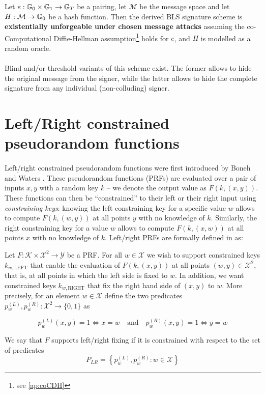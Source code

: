 \begin{theorem}
	Let $e : \mathbb{G}_0 \times \mathbb{G}_1 \rightarrow \mathbb{G}_T$ be a pairing, let $\mathcal{M}$ be the message space and let $H: \mathcal{M} \rightarrow \mathbb{G}_0$ be a hash function. Then the derived BLS signature scheme is \textbf{existentially unforgeable under chosen message attacks} assuming the co-Computational Diffie-Hellman assumption\footnote{see \autoref{ap:coCDH}} holds for $e$, and $H$ is modelled as a random oracle.
\end{theorem} 

\paragraph{} Blind and/or threshold variants of this scheme exist. The former allows to hide the original message from the signer, while the latter allows to hide the complete signature from any individual (non-colluding) signer.




\section{Left/Right constrained pseudorandom functions}

\paragraph{} Left/right constrained pseudorandom functions were first introduced by Boneh and Waters \cite{LRPRF}. These pseudorandom functions (PRFs) are evaluated over a pair of inputs $x,y$ with a random key $k$ -- we denote the output value as $F(k, (x,y))$. These functions can then be ``constrained'' to their left or their right input using \textit{constraining keys}: knowing the left constraining key for a specific value $w$ allows to compute $F(k, (w,y))$ at all points $y$ with no knowledge of $k$. Similarly, the right constraining key for a value $w$ allows to compute $F(k, (x,w))$ at all points $x$ with no knowledge of $k$. Left/right PRFs are formally defined in \cite{LRPRF} as:

\begin{definition}
	Let $F: \mathcal{K} \times \mathcal{X}^2 \rightarrow \mathcal{Y}$ be a PRF. For all $w \in \mathcal{X}$ we wish to support constrained keys $k_{w, \mathrm{LEFT}}$ that enable the evaluation of $F(k, (x,y))$ at all points $(w,y)\in \mathcal{X}^2$, that is, at all points in which the left side is fixed to $w$. In addition, we want constrained keys $k_{w,\mathrm{RIGHT}}$ that fix the right hand side of $(x,y)$ to $w$. More precisely, for an element $w \in \mathcal{X}$ define the two predicates $p_w^{(L)}, p_w^{(R)}: \mathcal{X}^2 \rightarrow \{0,1\}$ as
	
	$$
		p_w^{(L)}(x,y) = 1 \iff x = w \quad \mathrm{and} \quad p_w^{(R)}(x,y) = 1 \iff y = w 
	$$
	
	We say that $F$ supports left/right fixing if it is constrained with respect to the set of predicates
	$$
		P_{LR}=\left\{ p_w^{(L)}, p_w^{(R)}: w\in \mathcal{X} \right\}
	$$
	
\end{definition}

